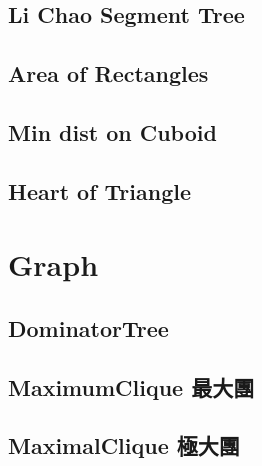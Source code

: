 \documentclass[a4paper,10pt,twocolumn,oneside]{article}
\begin{document}
\subsection{Li Chao Segment Tree}


\subsection{Area of Rectangles}


\subsection{Min dist on Cuboid}


\subsection{Heart of Triangle}


\section{Graph}
% 

\subsection{DominatorTree}


\subsection{MaximumClique 最大團}
% 


\subsection{MaximalClique 極大團}
% 


%
\end{document}

